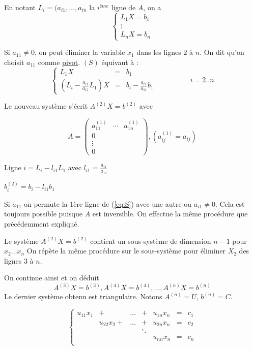 \documentclass[a4paper,11pt]{article}
\newcommand{\reff}[1]{(\ref{#1})}
\theoremstyle{plain} %
\begin{document}
En notant $L_i = (a_{i1}, \dots, a_{in}$ la $i^{ème}$ ligne de $A$, on a
\begin{equation}
    \left\lbrace
    \begin{array}{ccc}
        L_1 X = b_1 \\
        \vdots \\
        L_n X = b_n
    \end{array}\right.
    \tag{S}
    \label{eq:S}
\end{equation}


Si $a_{11} \neq 0$, on peut éliminer la variable $x_1$ dans les lignes 2 à $n$. On dit qu'on choisit $a_{11}$ comme \underline{pivot}.
$(S)$ équivaut à :
\[
    \left\lbrace
    \begin{array}{ccc}
        L_{1}X & = & b_1 \\
        (L_i - \frac{a_{i1}}{a_{11}}L_1) X & = & b_i - \frac{a_{i1}}{a_{11}}b_1 
    \end{array}\right.
    \hspace{2cm} i = 2..n
\]

Le nouveau système s'écrit $A^{(2)}X =b^{(2)}$ avec

\[
    A = 
    \begin{pmatrix}
        a_{11}^{(1)} & \cdots & a_{1n}^{(1)} \\
        0 \\
        \vdots \\
        0
    \end{pmatrix} 
    ,
    (a_{ij}^{(1)} = a_{ij})
\]

Ligne $i = L_i - l_{i1}L_1$ avec $l_{i1} = \frac{a_{i1}}{a_{11}}$

$b_i^{(2)} =  b_i - l_{i1}b_1$

Si $a_{11}$ on permute la 1ère ligne de \reff{eq:S} avec une autre ou $a_{i1} \neq 0$. Cela est toujours possible puisque $A$ est inversible.
On effectue la même procédure que précédemment expliqué.

Le système $A^{(2)} X = b^{(2)}$ contient un sous-système de dimension $n-1$ pour $x_2\dots x_n$
On répète la même procédure sur le sous-système pour éliminer $X_2$ des lignes 3 à $n$.

On continue ainsi et on déduit
\[
    A^{(3)}X = b^{(3)}, A^{(4)}X = b^{(4)}, \dots, A^{(n)}X=b^{(n)}
\]
Le dernier système obtenu est triangulaire. Notons $A^{(n)}=U$, $b^{(n)}=C$.

\begin{equation}
    \left\lbrace
    \begin{array}{ccccccc}
        u_{11}x_1 & + & \dots & + & u_{1n}x_n & = & c_1 \\
                  & u_{22}x_2 + & \dots & + & u_{2n}x_n & = & c_2 \\
        & & & \ddots \\
        & & & & u_{nn}x_n & = & c_n \\
    \end{array}\right.
    \tag{S'}
    \label{eq:S2}
\end{equation}
\end{document}

